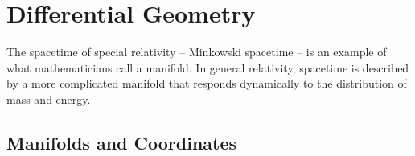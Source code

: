 \documentclass[a4paper]{article}
\theoremstyle{new}
\begin{document}
\begin{center}
\end{center}
\newpage
\section{Differential Geometry}
The spacetime of special relativity – Minkowski spacetime – is an example of what mathematicians call a manifold. In general relativity, spacetime is described by a more complicated manifold that responds dynamically to the distribution of mass and energy.
\subsection{Manifolds and Coordinates}
\end{document}
